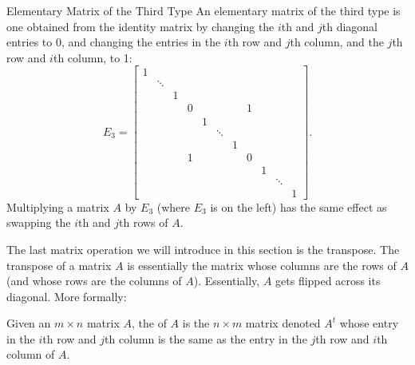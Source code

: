 \begin{edXshowhide}{Elementary Matrix of the Third Type}
An elementary matrix of the third type is one obtained from the identity matrix by changing the $i$th and $j$th diagonal entries to 0, and changing the entries in the $i$th row and $j$th column, and the $j$th row and $i$th column, to 1: 
\[ E_3 = \left[ 
\begin{array}{ccccccccccc}
1 &  &  &  &  &  &  & & & &\\
 & \ddots &  &  &  &  &  & & & &\\
 &   & 1& &  &  &  & & & & \\
 &   &  &  0 &  &  &  & 1 & & & \\
 &   &   &  & 1 &  &  & & & &\\
 &   &  &  &  & \ddots  & & & & & \\
 &   &  &  &  &   & 1 & & & & \\
&   &  &  1 &  &   &  & 0 & & &  \\ 
&   &  &  &  &   &  &  & 1 & & \\
&   &  &  &  &   &  &  &  & \ddots & \\ 
&   &  &  &  &   &  &  &  & & 1
 \end{array}
\right].  \]
Multiplying  a matrix $A$ by $E_3$ (where $E_3$ is on the left) has the same effect as swapping the $i$th and $j$th rows
of $A$.  
\end{edXshowhide}




\endedxtext

\endedxvertical





\endedxvertical



The last matrix operation we will introduce in this section is the transpose.  The transpose of a matrix $A$
is essentially the matrix whose columns are the rows of $A$ (and whose rows are the columns of $A$).  Essentially,
$A$ gets flipped across its diagonal.  More formally:

{}  Given an $m\times n$ matrix $A$, the {} of $A$ is the
$n\times m$ matrix denoted $A^t$ whose entry in the $i$th row and $j$th column is the same as the
entry in the $j$th row and $i$th column of $A$.  

